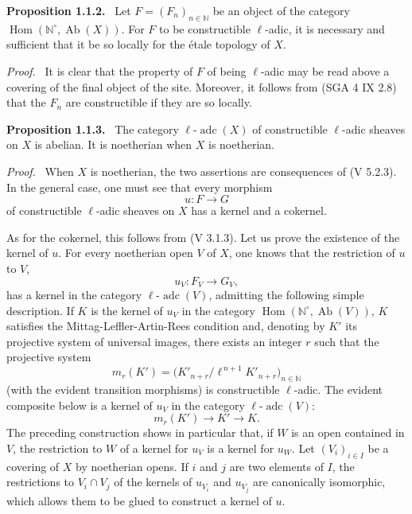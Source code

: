 \documentclass[11pt]{article}
\newenvironment{statement}[1]{\par\medskip\noindent\textbf{#1.}\ }{\par\medskip}
\newenvironment{prooftext}[1][Proof]{\par\noindent\emph{#1.}\ }{\par\medskip}
\DeclareMathOperator{\Hom}{Hom}
\providecommand{\Hom}{\operatorname{Hom}}
\providecommand{\Ab}{\operatorname{Ab}}
\providecommand{\adc}{\operatorname{adc}}
\begin{document}
\begin{statement}{Proposition 1.1.2}
Let \(F=(F_n)_{n\in\mathbb N}\) be an object of the category \(\Hom(\mathbb N^\circ,\Ab(X))\). For \(F\) to be constructible \(\ell\)-adic, it is necessary and sufficient that it be so locally for the étale topology of \(X\).
\end{statement}

\begin{prooftext}[Proof]
It is clear that the property of \(F\) of being \(\ell\)-adic may be read above a covering of the final object of the site. Moreover, it follows from (SGA 4 IX 2.8) that the \(F_n\) are constructible if they are so locally.
\end{prooftext}

\begin{statement}{Proposition 1.1.3}
The category \(\ell\text{-}\adc(X)\) of constructible \(\ell\)-adic sheaves on \(X\) is abelian. It is noetherian when \(X\) is noetherian.
\end{statement}

\begin{prooftext}[Proof]
When \(X\) is noetherian, the two assertions are consequences of (V 5.2.3). In the general case, one must see that every morphism
\[
u:F\longrightarrow G
\]
of constructible \(\ell\)-adic sheaves on \(X\) has a kernel and a cokernel.

As for the cokernel, this follows from (V 3.1.3). Let us prove the existence of the kernel of \(u\). For every noetherian open \(V\) of \(X\), one knows that the restriction of \(u\) to \(V\),
\[
u_V:F_V\longrightarrow G_V,
\]
has a kernel in the category \(\ell\text{-}\adc(V)\), admitting the following simple description. If \(K\) is the kernel of \(u_V\) in the category \(\Hom(\mathbb N^\circ,\Ab(V))\), \(K\) satisfies the Mittag-Leffler-Artin-Rees condition and, denoting by \(K'\) its projective system of universal images, there exists an integer \(r\) such that the projective system
\[
m_r(K')=\bigl(K'_{n+r}/\ell^{\,n+1}K'_{n+r}\bigr)_{n\in\mathbb N}
\]
(with the evident transition morphisms) is constructible \(\ell\)-adic. The evident composite below is a kernel of \(u_V\) in the category \(\ell\text{-}\adc(V)\):
\[
m_r(K')\longrightarrow K'\longrightarrow K.
\]
The preceding construction shows in particular that, if \(W\) is an open contained in \(V\), the restriction to \(W\) of a kernel for \(u_V\) is a kernel for \(u_W\). Let \((V_i)_{i\in I}\) be a covering of \(X\) by noetherian opens. If \(i\) and \(j\) are two elements of \(I\), the restrictions to \(V_i\cap V_j\) of the kernels of \(u_{V_i}\) and \(u_{V_j}\) are canonically isomorphic, which allows them to be glued to construct a kernel of \(u\).
\end{prooftext}
\end{document}
